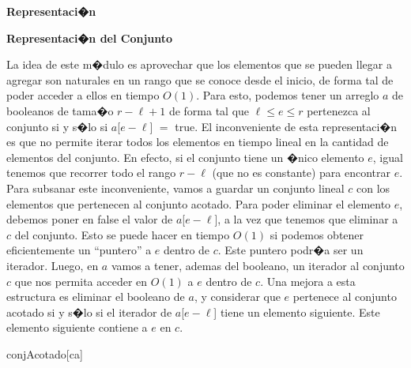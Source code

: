 \documentclass[a4paper,10pt]{article}
\newenvironment{Representacion}{%
  \vspace*{2ex}%
  \noindent\textbf{\Large Representaci�n}%
  \vspace*{2ex}%
}{}
\newcommand{\Titulo}[1]{
  \vspace*{1ex}\par\noindent\textbf{\large #1}\par
}
\begin{document}
\begin{Representacion}

  \Titulo{Representaci�n del Conjunto}
  
  La idea de este m�dulo es aprovechar que los elementos que se pueden llegar a agregar son naturales en un rango que se conoce desde el inicio, de forma tal de poder acceder a ellos en tiempo $O(1)$.  Para esto, podemos tener un arreglo $a$ de booleanos de tama�o $r - \ell + 1$ de forma tal que $\ell \leq e \leq r$ pertenezca al conjunto si y s�lo si $a$[$e-\ell$] $=$ true.  El inconveniente de esta representaci�n es que no permite iterar todos los elementos en tiempo lineal en la cantidad de elementos del conjunto.  En efecto, si el conjunto tiene un �nico elemento $e$, igual tenemos que recorrer todo el rango $r - \ell$ (que no es constante) para encontrar $e$.  Para subsanar este inconveniente, vamos a guardar un conjunto lineal $c$ con los elementos que pertenecen al conjunto acotado.  Para poder eliminar el elemento $e$, debemos poner en false el valor de $a$[$e-\ell$], a la vez que tenemos que eliminar a $c$ del conjunto.  Esto se puede hacer en tiempo $O(1)$ si podemos obtener eficientemente un ``puntero'' a $e$ dentro de $c$.  Este puntero podr�a ser un iterador.  Luego, en $a$ vamos a tener, ademas del booleano, un iterador al conjunto $c$ que nos permita acceder en $O(1)$ a $e$ dentro de $c$.  Una mejora a esta estructura es eliminar el booleano de $a$, y considerar que $e$ pertenece al conjunto acotado si y s�lo si el iterador de $a$[$e - \ell$] tiene un elemento siguiente.  Este elemento siguiente contiene a $e$ en $c$.

  \begin{Estructura}{conjAcotado}[ca]
    \begin{Tupla}[ca]%
    \end{Tupla}
  \end{Estructura}

  \mbox{}


\end{Representacion}
\end{document}
